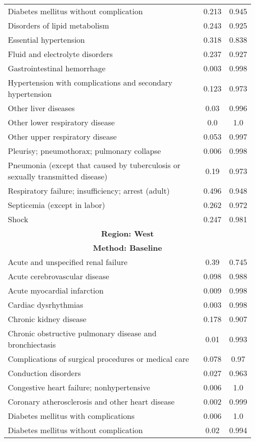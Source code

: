 \documentclass{article}
\begin{document}
\begin{longtable}{lcc}
Diabetes mellitus without complication & 0.213 & 0.945 \\
Disorders of lipid metabolism & 0.243 & 0.925 \\
Essential hypertension & 0.318 & 0.838 \\
Fluid and electrolyte disorders & 0.237 & 0.927 \\
Gastrointestinal hemorrhage & 0.003 & 0.998 \\
Hypertension with complications and secondary hypertension & 0.123 & 0.973 \\
Other liver diseases & 0.03 & 0.996 \\
Other lower respiratory disease & 0.0 & 1.0 \\
Other upper respiratory disease & 0.053 & 0.997 \\
Pleurisy; pneumothorax; pulmonary collapse & 0.006 & 0.998 \\
Pneumonia (except that caused by tuberculosis or sexually transmitted disease) & 0.19 & 0.973 \\
Respiratory failure; insufficiency; arrest (adult) & 0.496 & 0.948 \\
Septicemia (except in labor) & 0.262 & 0.972 \\
Shock & 0.247 & 0.981 \\
\midrule
\midrule
\multicolumn{3}{c}{\textbf{Region: West}} \\
\multicolumn{3}{c}{\textbf{Method: Baseline}} \\
\midrule
Acute and unspecified renal failure & 0.39 & 0.745 \\
Acute cerebrovascular disease & 0.098 & 0.988 \\
Acute myocardial infarction & 0.009 & 0.998 \\
Cardiac dysrhythmias & 0.003 & 0.998 \\
Chronic kidney disease & 0.178 & 0.907 \\
Chronic obstructive pulmonary disease and bronchiectasis & 0.01 & 0.993 \\
Complications of surgical procedures or medical care & 0.078 & 0.97 \\
Conduction disorders & 0.027 & 0.963 \\
Congestive heart failure; nonhypertensive & 0.006 & 1.0 \\
Coronary atherosclerosis and other heart disease & 0.002 & 0.999 \\
Diabetes mellitus with complications & 0.006 & 1.0 \\
Diabetes mellitus without complication & 0.02 & 0.994 \\

\end{longtable}
\end{document}
